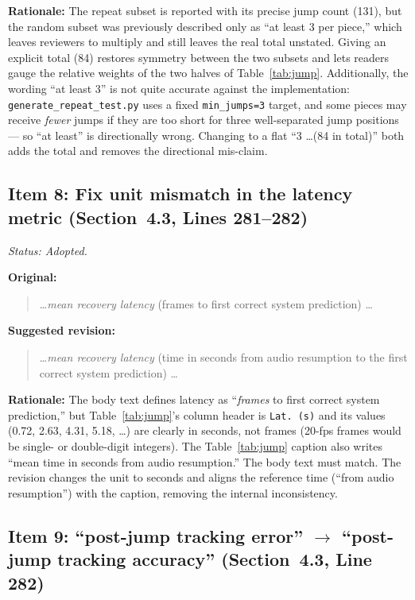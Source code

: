 \documentclass{article}
\begin{document}
\textbf{Rationale:}
The repeat subset is reported with its precise jump count (131), but the random subset was previously described only as ``at least 3 per piece,'' which leaves reviewers to multiply and still leaves the real total unstated. Giving an explicit total (84) restores symmetry between the two subsets and lets readers gauge the relative weights of the two halves of Table~\ref{tab:jump}. Additionally, the wording ``at least 3'' is not quite accurate against the implementation: \texttt{generate\_repeat\_test.py} uses a fixed \texttt{min\_jumps=3} target, and some pieces may receive \emph{fewer} jumps if they are too short for three well-separated jump positions --- so ``at least'' is directionally wrong. Changing to a flat ``3 \ldots (84 in total)'' both adds the total and removes the directional mis-claim.

\subsection*{Item 8: Fix unit mismatch in the latency metric (Section~4.3, Lines 281--282)}

\textit{Status: Adopted.}

\textbf{Original:}
\begin{quote}
\ldots \emph{mean recovery latency} (frames to first correct system prediction) \ldots
\end{quote}

\textbf{Suggested revision:}
\begin{quote}
\ldots \emph{mean recovery latency} (time in seconds from audio resumption to the first correct system prediction) \ldots
\end{quote}

\textbf{Rationale:}
The body text defines latency as ``\emph{frames} to first correct system prediction,'' but Table~\ref{tab:jump}'s column header is \texttt{Lat.\,(s)} and its values (0.72, 2.63, 4.31, 5.18, \ldots) are clearly in seconds, not frames (20-fps frames would be single- or double-digit integers). The Table~\ref{tab:jump} caption also writes ``mean time in seconds from audio resumption.'' The body text must match. The revision changes the unit to seconds and aligns the reference time (``from audio resumption'') with the caption, removing the internal inconsistency.

\subsection*{Item 9: ``post-jump tracking error'' $\to$ ``post-jump tracking accuracy'' (Section~4.3, Line 282)}
\end{document}

